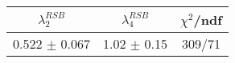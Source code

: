 \begin{tabular}{c|c||c}
$\lambda_{2}^{RSB}$ & $\lambda_4^{RSB}$ & $\chi^{2}$/ndf \\
\hline
0.522 $\pm$ 0.067 & 1.02 $\pm$ 0.15 & 309/71\\
\end{tabular}
